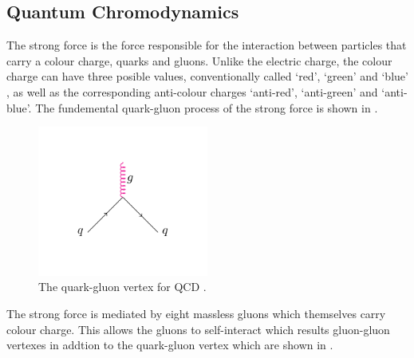 \subsection{Quantum Chromodynamics}
\label{sec:QCD}
The strong force is the force responsible for the interaction between particles
that carry a colour charge, quarks and gluons. Unlike the electric charge, the
colour charge can have three posible values, conventionally called `red',
`green' and `blue' , as well as the corresponding anti-colour charges
`anti-red', `anti-green' and `anti-blue'.
The fundemental quark-gluon process of the strong force is shown in
.
\begin{figure}[htbp]
  \centering
  \includegraphics[width=0.5\textwidth]{qcd_process}
  \caption{The quark-gluon vertex for {QCD} .}
  \label{fig:qcdquark}
\end{figure}
The strong force is mediated by eight massless gluons which themselves carry
colour charge. This allows the gluons to self-interact which results gluon-gluon
vertexes in addtion to the quark-gluon vertex which are shown in
.

